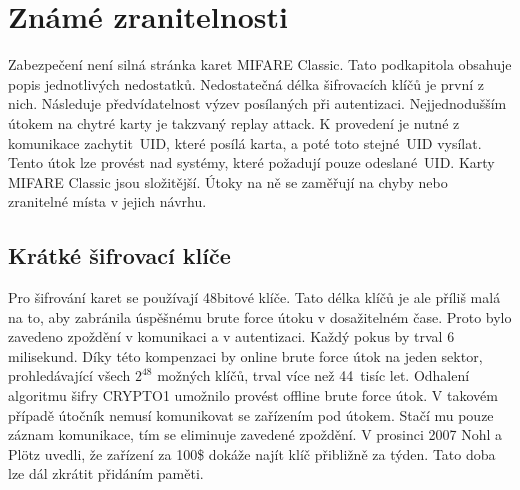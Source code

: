 \section{Známé zranitelnosti}
Zabezpečení není silná stránka karet MIFARE Classic. Tato podkapitola obsahuje popis jednotlivých nedostatků. Nedostatečná délka šifrovacích klíčů je první z nich. Následuje předvídatelnost výzev posílaných při autentizaci.
Nejjednodušším útokem na chytré karty je takzvaný replay attack. K provedení je nutné z komunikace zachytit~UID, které posílá karta, a poté toto stejné~UID vysílat. Tento útok lze provést nad systémy, které požadují pouze odeslané~UID. Karty MIFARE Classic jsou složitější. Útoky na ně se zaměřují na chyby nebo zranitelné místa v jejich návrhu\cite{Mifare_Classic_story}.
\par
\subsection{Krátké šifrovací klíče}
Pro šifrování karet se používají 48bitové klíče. Tato délka klíčů je ale příliš malá na to, aby zabránila úspěšnému brute force útoku v dosažitelném čase. Proto bylo zavedeno zpoždění v komunikaci a v autentizaci. Každý pokus by trval 6 milisekund. Díky této kompenzaci by online brute force útok na jeden sektor, prohledávající všech $2^{48}$ možných klíčů, trval více než 44~tisíc let. Odhalení algoritmu šifry CRYPTO1 umožnilo provést offline brute force útok. V takovém případě útočník nemusí komunikovat se zařízením pod útokem. Stačí mu pouze záznam komunikace, tím se eliminuje zavedené zpoždění. V prosinci 2007 Nohl a Plötz uvedli, že zařízení za 100\$ dokáže najít klíč přibližně za týden. Tato doba lze dál zkrátit přidáním paměti\cite{Cryptanalisis}.
\par
